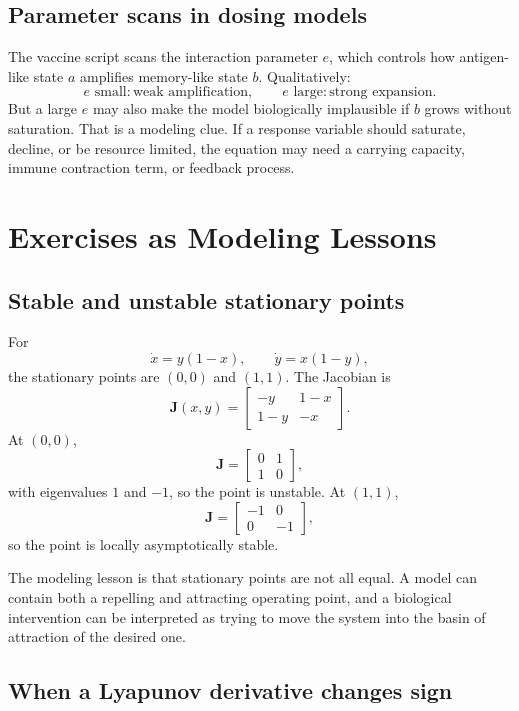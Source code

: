\documentclass[a4paper]{article}
\newcommand{\mat}[1]{\mathbf{#1}}
\newcommand{\J}{\mat J}
\begin{document}
\subsection{Parameter scans in dosing models}

The vaccine script scans the interaction parameter \(e\), which controls how antigen-like state \(a\) amplifies memory-like state \(b\). Qualitatively:
\[
  e \text{ small}: \text{weak amplification},
  \qquad
  e \text{ large}: \text{strong expansion}.
\]
But a large \(e\) may also make the model biologically implausible if \(b\) grows without saturation. That is a modeling clue. If a response variable should saturate, decline, or be resource limited, the equation may need a carrying capacity, immune contraction term, or feedback process.

\section{Exercises as Modeling Lessons}

\subsection{Stable and unstable stationary points}

For
\[
  \dot x=y(1-x),\qquad
  \dot y=x(1-y),
\]
the stationary points are \((0,0)\) and \((1,1)\). The Jacobian is
\[
  \J(x,y)=
  \begin{bmatrix}
  -y & 1-x\\
  1-y & -x
  \end{bmatrix}.
\]
At \((0,0)\),
\[
  \J=
  \begin{bmatrix}
  0&1\\
  1&0
  \end{bmatrix},
\]
with eigenvalues \(1\) and \(-1\), so the point is unstable. At \((1,1)\),
\[
  \J=
  \begin{bmatrix}
  -1&0\\
  0&-1
  \end{bmatrix},
\]
so the point is locally asymptotically stable.

The modeling lesson is that stationary points are not all equal. A model can contain both a repelling and attracting operating point, and a biological intervention can be interpreted as trying to move the system into the basin of attraction of the desired one.

\subsection{When a Lyapunov derivative changes sign}
\end{document}
